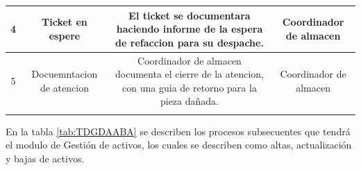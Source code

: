 \begin{table}[H]
{\begin{tabular}{|c|c|c|c|}
		\midrule
		4 & \multicolumn{1}{p{9.5em}|}{Ticket en espere} & \multicolumn{1}{p{29.785em}|}{El ticket se documentara haciendo informe de la espera de refaccion para su despache.} & \multicolumn{1}{p{14.645em}|}{Coordinador de almacen } \\
		\midrule
		5 & \multicolumn{1}{p{9.5em}|}{Docuemntacion de atencion } & \multicolumn{1}{p{29.785em}|}{Coordinador de almacen documenta el cierre de la atencion, con una  guia de retorno para la pieza dañada. } & \multicolumn{1}{p{14.645em}|}{Coordinador de almacen } \\
		\midrule
		&   &   &  \\
		\bottomrule
	\end{tabular}%
	\label{tab:TDPGDA}}%
\end{table}%


En la tabla \ref{tab:TDGDAABA} se describen los procesos subsecuentes que tendrá el modulo de Gestión de activos, los cuales se describen como altas, actualización y bajas de activos. 



